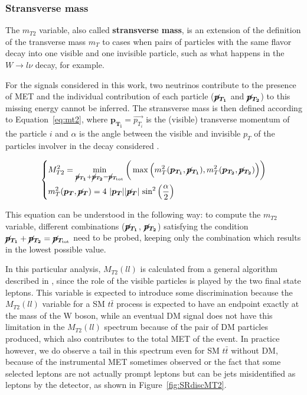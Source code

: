\documentclass[a4paper, 10pt, openright]{report}
\begin{document}
\subsubsection*{Stransverse mass}

The $m_{T2}$ variable, also called \textbf{stransverse mass}, is an extension of the definition of the transverse mass $m_T$ to cases when pairs of particles with the same flavor decay into one visible and one invisible particle, such as what happens in the $W \rightarrow l\nu$ decay, for example. 

For the signals considered in this work, two neutrinos contribute to the presence of \ac{MET} and the individual contribution of each particle ($\bm{\cancel{p}_{T_{1}}}$ and $\bm{\cancel{p}_{T_2}}$) to this missing energy cannot be inferred. The stransverse mass is then defined according to Equation~\ref{eq:mt2}, where $\bm{p_{T_i}} = \overrightarrow{p_{T_i}}$ is the (visible) transverse momentum of the particle $i$ and $\alpha$ is the angle between the visible and invisible $p_T$ of the particles involver in the decay considered \cite{MT2}.

\begin{equation}
\label{eq:mt2}
\begin{dcases}
M_{T2}^2 = \min_{\bm{\cancel{p}_{T_{1}}} + \bm{\cancel{p}_{T_{2}}} = \bm{\cancel{p}_{T_{\text{tot}}}}} \bigg (\max \Big (m_T^2(\bm{p_{T_1}}, \bm{\cancel{p}_{T_{1}}}), m_T^2(\bm{p_{T_2}}, \bm{\cancel{p}_{T_{2}}}) \Big ) \bigg ) \\
m_T^2(\bm{p_{T}}, \bm{\cancel{p}_{T}}) = 4 \text{ } |\bm{p_{T}}| |\bm{\cancel{p}_{T}}| \text{ sin}^2 \left (\frac{\alpha}{2} \right ) 
\end{dcases}
\end{equation}

This equation can be understood in the following way: to compute the $m_{T2}$ variable, different combinations ($\bm{\cancel{p}_{T_{1}}}$, $\bm{\cancel{p}_{T_{2}}}$) satisfying the condition $\bm{\cancel{p}_{T_{1}}} + \bm{\cancel{p}_{T_{2}}} = \bm{\cancel{p}_{T_{\text{tot}}}}$ need to be probed, keeping only the combination which results in the lowest possible value.

In this particular analysis, $M_{T2}(ll)$ is calculated from a general algorithm described in \cite{MT2Calc}, since the role of the visible particles is played by the two final state leptons. This variable is expected to introduce some discrimination because the $M_{T2}(ll)$ variable for a \ac{SM} $t \bar t$ process is expected to have an endpoint exactly at the mass of the W boson, while an eventual \ac{DM} signal does not have this limitation in the $M_{T2}(ll)$ spectrum because of the pair of \ac{DM} particles produced, which also contributes to the total \ac{MET} of the event. In practice however, we do observe a tail in this spectrum even for \ac{SM} $t \bar t$ without \ac{DM}, because of the instrumental \ac{MET} sometimes observed or the fact that some selected leptons are not actually prompt leptons but can be jets misidentified as leptons by the detector, as shown in Figure~\ref{fig:SRdiscMT2}.
\end{document}
